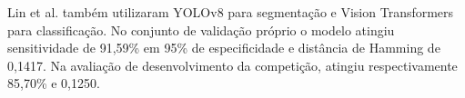 \documentclass[12pt]{article}
\begin{document}
Lin et al. \cite{justraigs_hu_lin} também utilizaram YOLOv8 para segmentação e Vision Transformers para classificação. No conjunto de validação próprio o modelo atingiu sensitividade de 91,59\% em 95\% de especificidade e distância de Hamming de 0,1417. Na avaliação de desenvolvimento da competição, atingiu respectivamente 85,70\% e 0,1250.



\end{document}

